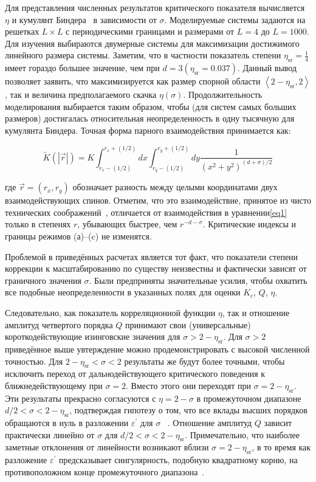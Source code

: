 Для представления численных результатов критического показателя вычисляется $\eta$ и кумулянт Биндера~\cite{10.1007/BF01293604} в зависимости от $\sigma$. 
Моделируемые системы задаются на решетках $L\times L$ с периодическими границами и размерами от $L=4$ до $L=1000$. 
Для изучения выбираются двумерные системы для максимизации достижимого линейного размера системы.
Заметим, что в частности показатель степени $\eta_{\mathrm{sr}}=\frac{1}{4}$ имеет гораздо большее значение, чем при $d=3\left(\eta_{\mathrm{sr}}=0.037\right)$. 
Данный вывод позволяет заявить, что максимизируется как размер спорной области $\left\langle 2-\eta_{\mathrm{sr}}, 2\right\rangle$, так и величина предполагаемого скачка $\eta(\sigma)$.
Продолжительность моделирования выбирается таким образом, чтобы (для систем самых больших размеров) достигалась относительная неопределенность в одну тысячную для кумулянта Биндера.
Точная форма парного взаимодействия принимается как:

\begin{equation}
\tilde{K}(|\vec{r}|)=K \int_{r_{x}-(1 / 2)}^{r_{x}+(1 / 2)} d x \int_{r_{y}-(1 / 2)}^{r_{y}+(1 / 2)} d y \frac{1}{\left(x^{2}+y^{2}\right)^{(d+\sigma) / 2}}
\end{equation}

где $\vec r=\left(r_{x}, r_{y}\right)$ обозначает разность между целыми координатами двух взаимодействующих спинов. 
Отметим, что это взаимодействие, принятое из чисто технических соображений~\cite{10.1142/S0129183195000265}, отличается от взаимодействия в уравнении\ref{eq1} только в степенях $r$, убывающих быстрее, чем $r^{-d-\sigma}$. 
Критические индексы и границы режимов (а)–(c) не изменятся. 

Проблемой в приведённых расчетах является тот факт, что показатели степени коррекции к масштабированию по существу неизвестны и фактически зависят от граничного значения $\sigma$. 
Были предприняты значительные усилия, чтобы охватить все подобные неопределенности в указанных полях для оценки $K_{c}$, $Q$, $\eta$.

Следовательно, как показатель корреляционной функции $\eta$, так и отношение амплитуд четвертого порядка $Q$ принимают свои (универсальные) короткодействующие изинговские значения для $\sigma>2-\eta_{\mathrm{sr}}$. 
Для $\sigma>2$ приведённое выше увтерждение можно продемонстрировать с высокой численной точностью. Для $2-\eta_{\mathrm{sr}}<\sigma<2$ результаты же будут более точными, чтобы исключить переход от дальнодействующего критического поведения к ближнедействующему при $\sigma=2$.
Вместо этого они переходят при $\sigma=2-\eta_{\mathrm{sr}}$. 
Эти результаты прекрасно согласуются с $\eta=2-\sigma$ в промежуточном диапазоне $d/2<\sigma<2-\eta_{\mathrm{sr}}$, подтверждая гипотезу о том, что все вклады высших порядков обращаются в нуль в разложении $\varepsilon^{\prime}$ для $\sigma$ ~\cite{10.1103/PhysRevLett.29.917}.
Отношение амплитуд $Q$ зависит практически линейно от $\sigma$ для $d/2<\sigma<2-\eta_{\mathrm{sr}}$.
Примечательно, что наиболее заметные отклонения от линейности возникают вблизи $\sigma=2-\eta_{\mathrm{sr}}$, в то время как разложение $\varepsilon^{\prime}$ предсказывает сингулярность, подобную квадратному корню, на противоположном конце промежуточного диапазона~\cite{10.1103/PhysRevE.60.7558}.


